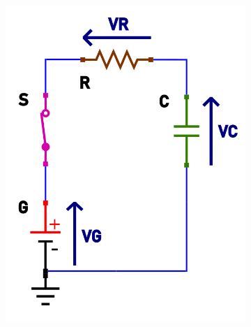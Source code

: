 \documentclass{article}
\begin{document}
\begin{figure}[h!]
\begin{subfigure}[b]{0.347\linewidth}
    \includegraphics[width=\linewidth]{data/carica-tensioni.png}
  \end{subfigure}
\end{figure}
\end{document}
